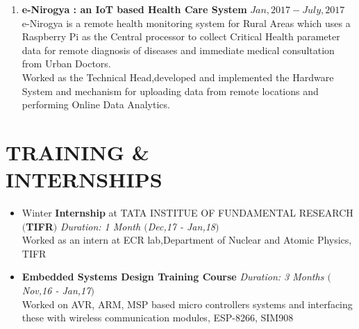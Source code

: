 \documentclass[margin]{res}
\begin{document}
\begin{resume}
\begin{enumerate}
\item \textbf{ e-Nirogya : an IoT based Health Care System}                     \hfill             \(Jan,2017-July,2017\)\\
e-Nirogya is a remote health monitoring system for Rural Areas which uses a Raspberry Pi as the Central processor to collect Critical Health parameter data for remote diagnosis of diseases and immediate medical consultation from Urban Doctors.\\
Worked as the Technical Head,developed and implemented the Hardware System and mechanism for uploading data from remote locations and performing Online Data Analytics.   

\end{enumerate}

\section{TRAINING \&\\ INTERNSHIPS}
\begin{itemize}
  \item Winter \textbf{Internship} at TATA INSTITUE OF FUNDAMENTAL RESEARCH \textbf{$($TIFR$)$ }\hfill \textit{Duration: 1 Month $($Dec,17 - Jan,18$)$} \\
 Worked as an intern at ECR lab,Department of Nuclear and Atomic Physics, TIFR
  
  \item \textbf{Embedded Systems Design Training Course} \hfill \textit{Duration: 3 Months $($Nov,16 - Jan,17$)$} \\
 Worked on AVR, ARM, MSP based micro controllers systems and interfacing these with wireless communication modules, ESP-8266, SIM908
  
\end{itemize}



\end{resume}
\end{document}
